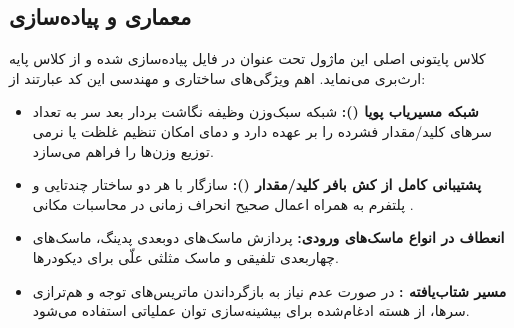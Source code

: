 \subsection{معماری و پیاده‌سازی}
کلاس پایتونی اصلی این ماژول تحت عنوان  در فایل  پیاده‌سازی شده و از کلاس پایه  ارث‌بری می‌نماید. اهم ویژگی‌های ساختاری و مهندسی این کد عبارتند از:
\begin{itemize}
    \item \textbf{شبکه مسیریاب پویا ():} شبکه سبک‌وزن  وظیفه نگاشت بردار بعد سر به تعداد سرهای کلید/مقدار فشرده را بر عهده دارد و دمای  امکان تنظیم غلظت یا نرمی توزیع وزن‌ها را فراهم می‌سازد.
    \item \textbf{پشتیبانی کامل از کش بافر کلید/مقدار ():} سازگار با هر دو ساختار چندتایی و  پلتفرم  به همراه اعمال صحیح انحراف زمانی  در محاسبات مکانی .
    \item \textbf{انعطاف در انواع ماسک‌های ورودی:} پردازش ماسک‌های دوبعدی پدینگ، ماسک‌های چهاربعدی تلفیقی و ماسک مثلثی علّی برای دیکودرها.
    \item \textbf{مسیر شتاب‌یافته :} در صورت عدم نیاز به بازگرداندن ماتریس‌های توجه و هم‌ترازی سرها، از هسته ادغام‌شده  برای بیشینه‌سازی توان عملیاتی استفاده می‌شود.
\end{itemize}
